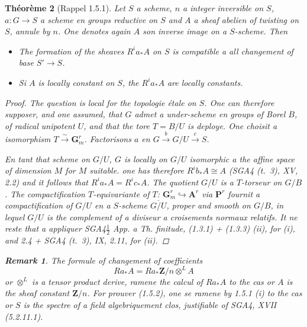 \documentclass[11pt,a4paper]{article}
\theoremstyle{plain}
\newtheorem{theorem}{Th\'eor\`eme}[section]
\theoremstyle{definition}
\newtheorem{remark}[theorem]{Remark}
\begin{document}
\begin{theorem}[Rappel 1.5.1]\label{1.5.1}
Let $S$ a scheme, $n$ a integer inversible on $S$, $a : G \to S$ a scheme en groups reductive on $S$ and $A$ a sheaf abelien of twisting on $S$, annule by $n$. One denotes again $A$ son inverse image on a $S$-scheme. Then
\begin{itemize}
\item[(i)] The formation of the sheaves $R^i a_* A$ on $S$ is compatible a all changement of base $S' \to S$.
\item[(ii)] Si $A$ is locally constant on $S$, the $R^i a_* A$ are locally constants.
\end{itemize}

\begin{proof}
The question is local for the topologie étale on $S$. One can therefore supposer, and one assumed, that $G$ admet a under-scheme en groups of Borel $B$, of radical unipotent $U$, and that the tore $T = B/U$ is deploye. One choisit a isomorphism $T \xrightarrow{\sim} \mathbf{G}_m^r$. Factorisons $a$ en $G \xrightarrow{b} G/U \xrightarrow{c} S$.

En tant that scheme on $G/U$, $G$ is locally on $G/U$ isomorphic a the affine space of dimension $M$ for $M$ suitable. one has therefore $R^i b_* A \cong A$ (SGA4 (t.~3), XV, 2.2) and it follows that $R^i a_* A = R^i c_* A$. The quotient $G/U$ is a $T$-torseur on $G/B$. The compactification $T$-equivariante of $T$: $\mathbf{G}_m^r \hookrightarrow \mathbf{A}^r$ via $\mathbf{P}^r$ fournit a compactification of $G/U$ en a $S$-scheme $\overline{G/U}$, proper and smooth on $G/B$, in lequel $G/U$ is the complement of a diviseur a croisements normaux relatifs. It ne reste that a appliquer SGA4$\frac{1}{2}$ App. a Th. finitude, (1.3.1) + (1.3.3) (ii), for (i), and 2.4 + SGA4 (t.~3), IX, 2.11, for (ii).
\end{proof}

\begin{remark}
The formule of changement of coefficients
\begin{equation}\label{1.5.2}
R a_* A = R a_* \mathbf{Z}/n \otimes^L A
\end{equation}
or $\otimes^L$ is a tensor product derive, ramene the calcul of $R a_* A$ to the cas or $A$ is the sheaf constant $\mathbf{Z}/n$. For prouver (1.5.2), one se ramene by 1.5.1 (i) to the cas or $S$ is the spectre of a field algebriquement clos, justifiable of SGA4, XVII (5.2.11.1).
\end{remark}


\end{theorem}
\end{document}
